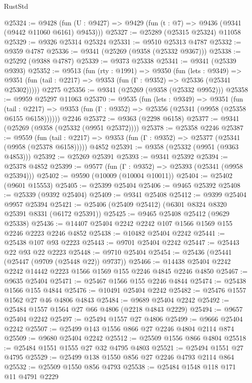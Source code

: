 \begin{lexlean}{RustStd}
\begin{coremodule}
@25324 := @9428
    (fun (U : @9427) => @9429 (fun (t : @7) => @9436 (@9341 (@9442 @11060 @6161) @9453)))
@25327 := @25289 (@25315 @25324) @11058
@25329 := @9326 @25314 @25324
@25331 := @9510 @25313 @4787
@25332 := @9359 @4787
@25336 := @9341 (@25269 (@9358 (@25332 @9367)))
@25338 := @25292 (@9388 @4787)
@25339 := @9373 @25338
@25341 := @9341 (@25339 @9393)
@25352 := @9513
    (fun (rty : @1991) =>
    @9350
      (fun (lets : @9349) =>
      @9351 (fun (tail : @2217) => @9353 (fun (Γ : @9352) => @25336 (@25341 @25302)))))
    @2275
@25356 := @9341 (@25269 (@9358 (@25332 @9952)))
@25358 := @9959 @25297 @11063
@25370 := @9535
    (fun (lets : @9349) =>
    @9351
      (fun (tail : @2217) =>
      @9353 (fun (Γ : @9352) => @25356 (@25341 (@9958 (@25358 @6155 @6158))))))
    @2246
@25372 := @9363 (@2298 @6158)
@25377 := @9341 (@25269 (@9358 (@25332 (@9951 @25372))))
@25378 := @25358 @2246
@25387 := @9559
    (fun (tail : @2217) => @9353 (fun (Γ : @9352) => @25377 (@25341 (@9958 (@25378 @6158)))))
    @4852
@25391 := @9358 (@25332 (@9951 (@9363 @4853)))
@25392 := @25269 @25391
@25393 := @9341 @25392
@25394 := @25378 @4852
@25399 := @9577 (fun (Γ : @9352) => @25393 (@25341 (@9958 @25394)))
@25402 := @9590 (@10009 (@10004 @10011))
@25404 := @25402 (@9601 @15553)
@25405 := @25399 @25404
@25406 := @9465 @25392
@25408 := @25339 (@9392 @25404)
@25409 := @9341 @25408
@25412 := @9399 @25404 @9957 @25394
@25421 := @25406 (@25409 @25412) (@6301 @8324 @8320 @25391 @8331 (@6172 @25391))
@25425 := @9465 @25408 @25412 (@9629 @25338)
@25436 := @14407 @25404 @2242 @2242 @107 @1566 @1569 @155 @2246 @2223 @2246 @4852
@25438 := @10482 @25404 @2242
@25441 := @25438 @107 @93 @2223
@25443 := @9701 @25404 @2242
@25447 := @25443 @22 @93 @22 @2223
@25448 := @9710 @25404
@25454 := @25436 (@25441 (@25447 (@9709 (@25448 @22)) @9737))
@25466 := @14438 @25404 @2242 @2242 @14442 @2223 @1566 @1569 @155 @2246 @4845 @2246 @4850
@25467 := @9635 @25404
@25471 := @25467 @1566 @155 @2246 @4844
@25474 := @25438 @1566 @155 @4844
@25476 := @10491 @25404 @2242
@25482 := @25476 @1557 @1562 @27 @46 @4806 @4843
@25484 := @9689 @25404 @2242
@25492 := @25484 @1557 @1564 @27 @66 @4806 (@2218 @4843 @2229)
@25494 := @9657 @25404 @2242
@25497 := @25494 @1557 @27 @4806
@25499 := @9666 @25404 @2242
@25507 := @25499 @143 @1556 @866 @27 @2246 @4804 @2114 @874
@25509 := @9680 @25404 @2242
@25512 := @25509 @1556 @866 @4804
@25518 := @25484 @1551 @1555 @27 @32 @4795 @4803
@25521 := @25494 @1551 @27 @4795
@25529 := @25499 @138 @1550 @856 @27 @2246 @4793 @2114 @864
@25532 := @25509 @1550 @856 @4793
@25538 := @25484 @1548 @118 @171 @11 @4791 @2229

\end{coremodule}
\end{lexlean}
